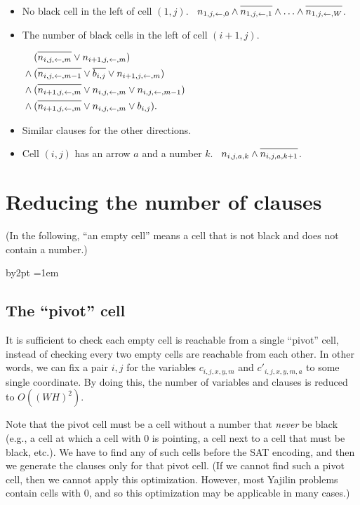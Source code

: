 \documentclass[a4paper]{article}
\newcommand{\N}[1]{\overline{#1\vphantom{l}}}
\renewcommand{\L}{{\leftarrow}}
\begin{document}
\begin{itemize}
\item
  No black cell in the left of cell $(1,j)$. \
$n_{1,j,\L,0}
\land \N{n_{1,j,\L,1}} \land\ldots\land \N{n_{1,j,\L,W}}$.

\item
  The number of black cells in the left of cell $(i+1,j)$.
  \par\qquad
  $\begin{aligned}[t]
   &(\N{n_{i,j,\L,m}}\lor n_{i+1,j,\L,m})\\{}\land{}
   &(\N{n_{i,j,\L,m-1}}\lor\N{b_{i,j}}\lor n_{i+1,j,\L,m})\\{}\land{}
   &(\N{n_{i+1,j,\L,m}}\lor n_{i,j,\L,m}\lor n_{i,j,\L,m-1})\\
   {}\land{}
   &(\N{n_{i+1,j,\L,m}}\lor n_{i,j,\L,m}\lor b_{i,j}).
   \end{aligned}$

\item Similar clauses for the other directions.

\item
  Cell $(i,j)$ has an arrow $a$ and a number $k$. \
  $n_{i,j,a,k}\land\N{n_{i,j,a,k+1}}$.
\end{itemize}

\section{Reducing the number of clauses}

(In the following, ``an empty cell'' means a cell that is not black
and does not contain a number.)

\newcommand{\id}{\mathit{id}}
\advance\parskip by2pt
\parindent=1em

\subsection{The ``pivot'' cell}

It is sufficient to check each empty cell
is reachable from a single ``pivot'' cell, instead of
checking every two empty cells are reachable
from each other.
In other words,
we can fix a pair $i,j$ for
the variables $c_{i,j,x,y,m}$ and $c'_{i,j,x,y,m,a}$ to
some single coordinate.
By doing this, the number of variables and clauses
is reduced to $O((WH)^2)$.

Note that the pivot cell must be a cell without a number
that \emph{never} be black
(e.g., a cell at which a cell with $0$ is pointing,
a cell next to a cell that must be black, etc.).
We have to find any of such cells before the SAT encoding,
and then we generate the clauses only for that pivot cell.
(If we cannot find such a pivot cell, then
we cannot apply this optimization.
However, most Yajilin problems contain cells with $0$,
and so this optimization may be applicable in many cases.)
\end{document}

